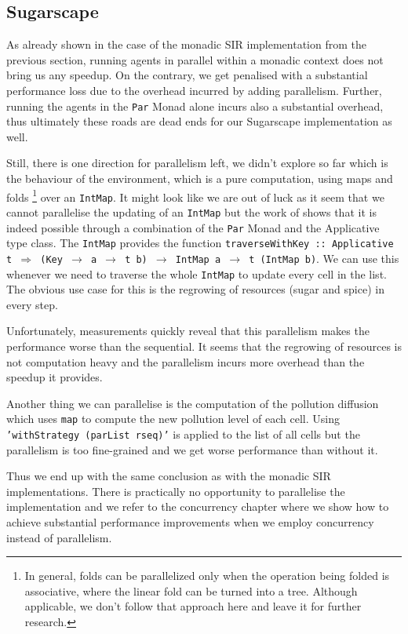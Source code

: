 \subsection{Sugarscape}
As already shown in the case of the monadic SIR implementation from the previous section, running agents in parallel within a monadic context does not bring us any speedup. On the contrary, we get penalised with a substantial performance loss due to the overhead incurred by adding parallelism. Further, running the agents in the \texttt{Par} Monad alone incurs also a substantial overhead, thus ultimately these roads are dead ends for our Sugarscape implementation as well.

Still, there is one direction for parallelism left, we didn't explore so far which is the behaviour of the environment, which is a pure computation, using maps and folds \footnote{In general, folds can be parallelized only when the operation being folded is associative, where the linear fold can be turned into a tree. Although applicable, we don't follow that approach here and leave it for further research.} over an \texttt{IntMap}. It might look like we are out of luck as it seem that we cannot parallelise the updating of an \texttt{IntMap} but the work of \cite{marlow_parallel_2013} shows that it is indeed possible through a combination of the \texttt{Par} Monad and the Applicative type class. The \texttt{IntMap} provides the function \texttt{traverseWithKey :: Applicative t $\Rightarrow$ (Key $\rightarrow$ a $\rightarrow$ t b) $\rightarrow$ IntMap a $\rightarrow$ t (IntMap b)}. We can use this whenever we need to traverse the whole \texttt{IntMap} to update every cell in the list. The obvious use case for this is the regrowing of resources (sugar and spice) in every step.

Unfortunately, measurements quickly reveal that this parallelism makes the performance worse than the sequential. It seems that the regrowing of resources is not computation heavy and the parallelism incurs more overhead than the speedup it provides.

Another thing we can parallelise is the computation of the pollution diffusion which uses \texttt{map} to compute the new pollution level of each cell. Using \texttt{'withStrategy (parList rseq)'} is applied to the list of all cells but the parallelism is too fine-grained and we get worse performance than without it. %

Thus we end up with the same conclusion as with the monadic SIR implementations. There is practically no opportunity to parallelise the implementation and we refer to the concurrency chapter where we show how to achieve substantial performance improvements when we employ concurrency instead of parallelism.